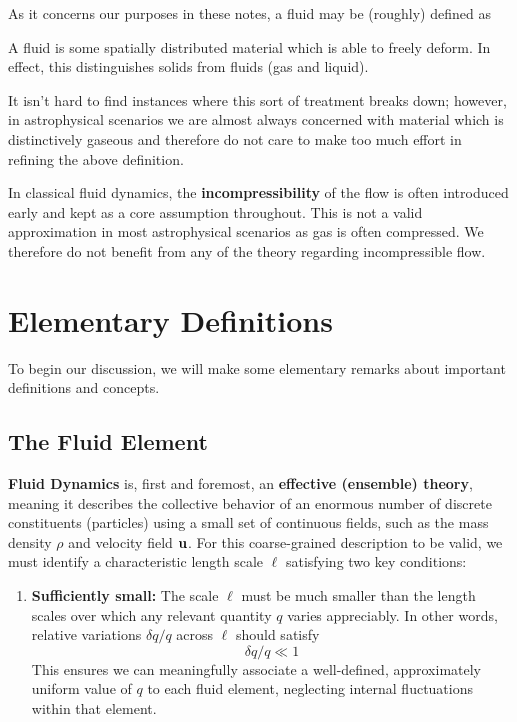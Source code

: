 As it concerns our purposes in these notes, a fluid may be (roughly) defined as
\begin{definition}[Fluid]
A fluid is some spatially distributed material which is able to freely deform. In effect, this distinguishes solids from fluids (gas and liquid). 
\end{definition}
\begin{remark}
    It isn't hard to find instances where this sort of treatment breaks down; however, in astrophysical scenarios we are almost always concerned with material which is distinctively gaseous and therefore do not care to make too much effort in refining the above definition.
\end{remark}

In classical fluid dynamics, the \textbf{incompressibility} of the flow is often introduced early and kept as a core assumption throughout. This is not a valid approximation in most astrophysical scenarios as gas is often compressed. We therefore do not benefit from any of the theory regarding incompressible flow.

\section{Elementary Definitions}
To begin our discussion, we will make some elementary remarks about important definitions and concepts.

\subsection{The Fluid Element}

\textbf{Fluid Dynamics} is, first and foremost, an \textbf{effective (ensemble) theory}, meaning it describes the collective behavior of an enormous number of discrete constituents (particles) using a small set of continuous fields, such as the mass density $\rho$ and velocity field ${\bf u}$. For this coarse-grained description to be valid, we must identify a characteristic length scale $\ell$ satisfying two key conditions:
\vspace{0.25cm}
\begin{enumerate}
    \item \textbf{Sufficiently small:} The scale $\ell$ must be much smaller than the length scales over which any relevant quantity $q$ varies appreciably. In other words, relative variations $\delta q/q$ across $\ell$ should satisfy 
\begin{equation}
    \label{eq:fluid_condition_1}
    \delta q/q \ll 1
\end{equation}
This ensures we can meaningfully associate a well-defined, approximately uniform value of $q$ to each fluid element, neglecting internal fluctuations within that element.
\end{enumerate}


